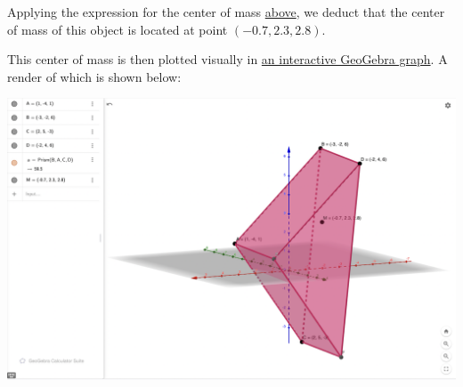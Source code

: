 \documentclass[letterpaper]{article}
\begin{document}
Applying the expression for the center of mass \hyperref[sec:org348a133]{above}, we deduct that the center of mass of this object is located at point \((-0.7, 2.3, 2.8)\).

This center of mass is then plotted visually in \href{https://www.geogebra.org/calculator/mcbexbqm}{an interactive GeoGebra graph}. A render of which is shown below:

\begin{center}
\includegraphics[width=.9\linewidth]{Calculating_the_Center_of_Mass/2021-09-02_21-52-06_screenshot.png}
\end{center}
\end{document}
